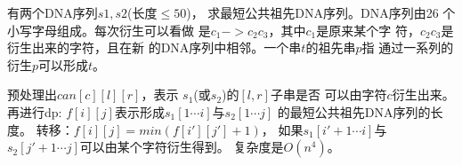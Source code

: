 \begin{prob}
	有两个DNA序列$s1,s2$(长度$\le 50$)，
	求最短公共祖先DNA序列。DNA序列由26
	个小写字母组成。每次衍生可以看做
	是$c_1->c_2c_3$，其中$c_1$是原来某个字
	符，$c_2c_3$是衍生出来的字符，且在新
	的DNA序列中相邻。一个串$t$的祖先串$p$指
	通过一系列的衍生$p$可以形成$t$。
\end{prob}

\begin{sol}
	预处理出$can[c][l][r]$，表示
	$s_1$(或$s_2$)的$[l,r]$子串是否
	可以由字符$c$衍生出来。再进行dp:
	$f[i][j]$表示形成$s_1[1 \cdots i]$与$s_2[1 \cdots j]$
	的最短公共祖先DNA序列的长度。
	转移：$f[i][j] = min(f[i'][j']+1)$，
	如果$s_1[i'+1\cdots i]$与
	$s_2[j'+1 \cdots j]$可以由某个字符衍生得到。
	复杂度是$O(n^4)$。
\end{sol}
